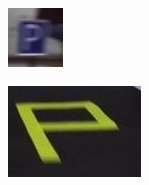 \begin{figure}[h]
\begin{subfigure}[b]{0.15\linewidth}
    \caption{}
  \end{subfigure}
  \begin{subfigure}[b]{0.15\linewidth}
      \includegraphics[width=\linewidth]{figures/signs/Parking.jpg}
    \caption{}
  \end{subfigure}
  \begin{subfigure}[b]{0.15\linewidth}
      \includegraphics[width=\linewidth]{figures/signs/ParkingSlot.jpg}
    \caption{}

\end{subfigure}
\end{figure}
